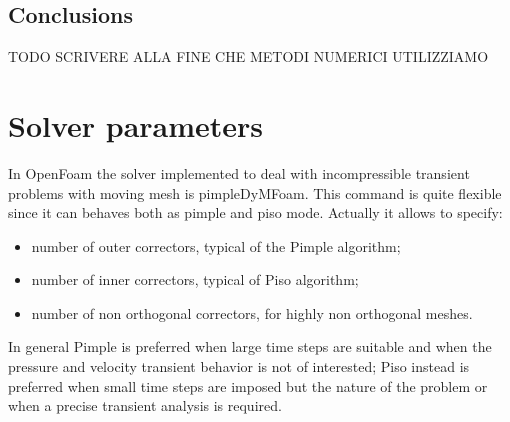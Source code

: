\documentclass[a4paper,12pt]{article}
\newcommand{\todo}{\colorbox{cyan!60}{TODO}}
\newcommand{\foam}[1]{{\ttfamily #1}}
\begin{document}
\subsection{Conclusions}

\todo{} SCRIVERE ALLA FINE CHE METODI NUMERICI UTILIZZIAMO


\section{Solver parameters}

In OpenFoam the solver implemented to deal with incompressible transient problems with moving mesh is \foam{pimpleDyMFoam}.
This command is quite flexible since it can behaves both as pimple and piso mode. 
Actually it allows to specify:
\begin{itemize}
\item number of outer correctors, typical of the Pimple algorithm;
\item number of inner correctors, typical of Piso algorithm;
\item number of non orthogonal correctors, for highly non orthogonal meshes.
\end{itemize}

In general Pimple is preferred when large time steps are suitable and when the pressure and velocity transient behavior is not of interested;
Piso instead is preferred when small time steps are imposed but the nature of the problem or when a precise transient analysis is required.
\end{document}
